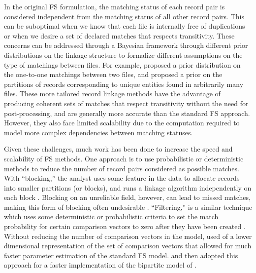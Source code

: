 \documentclass[12pt,letterpaper]{article}
\newcommand{\1}[1]{\mathbb{I}\!\left[#1\right]} %
\begin{document}
In the original FS formulation, the matching status of each record pair is considered independent from the matching status of all other record pairs. This can be suboptimal when we know that each file is internally free of duplications or when we desire a set of declared matches that respects transitivity. These concerns can be addressed through a Bayesian framework through different prior distributions on the linkage structure to formalize different assumptions on the type of matchings between files. For example, \cite{sadinle_bayesian_2017} proposed a prior distribution on the one-to-one matchings between two files, and \cite{aleshin2023multifile} proposed a prior on the partitions of records corresponding to unique entities found in arbitrarily many files. These more tailored record linkage methods have the advantage of producing coherent sets of matches that respect transitivity without the need for post-processing, and are generally more accurate than the standard FS approach. However, they also face limited scalability due to the computation required to model more complex dependencies between matching statuses. 


Given these challenges, much work has been done to increase the speed and scalability of FS methods. One approach is to use probabilistic or deterministic methods to reduce the number of record pairs considered as possible matches. With ``blocking,'' the analyst uses some feature in the data to allocate records into smaller partitions (or blocks), and runs a linkage algorithm independently on each block \citep{christen_data_2012}. Blocking on an unreliable field, however, can lead to missed matches, making this form of blocking often undesirable \citep{steorts_comparison_2014}. ``Filtering,'' is a similar technique which uses some deterministic or probabilistic criteria to set the match probability for certain comparison vectors to zero after they have been created \citep{murray2016probabilistic, mcveigh2019scaling}. Without reducing the number of comparison vectors in the model,  \cite{enamorado_using_2019} used of a lower dimensional representation of the set of comparison vectors that allowed for much faster parameter estimation of the standard FS model. \cite{kundinger_2023} and \cite{kundinger_2024_vabl} then adopted this approach for a faster implementation of the bipartite model of \cite{sadinle_bayesian_2017}.
 
\end{document}
